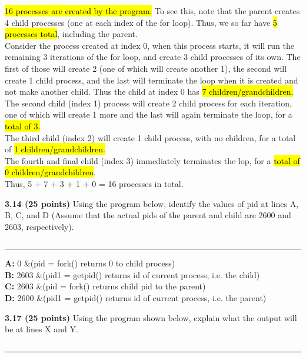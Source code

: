 \documentclass[12pt]{jhwhw}
\begin{document}
	\begin{addmargin}[1em]{}
		\hl{16 processes are created by the program.}
		\bigbreak
		To see this, note that the parent creates 4 child processes (one at each
		index of the for loop). Thus, we so far have \hl{5 processes total}, 
		including the parent. \\
		Consider the process created at index 0, when this process starts, it will run
		the remaining 3 iterations of the for loop, and create 3 child processes of its
		own. The first of those will create 2 (one of which will create another 1), the second
		will create 1 child process, and the last will terminate the loop when it is created
		and not make another child. Thus the child at index 0 has \hl{7 children/grandchildren.} \\
		The second child (index 1) process will create 2 child process for each iteration, one of
		which will create 1 more and the last will again terminate the loop, 
		for a \hl{total of 3.} \\
		The third child (index 2) will create 1 child process, with no children, 
		for a total of \hl{1 children/grandchildren.} \\
		The fourth and final child (index 3) immediately terminates the lop, 
		for a \hl{total of 0 children/grandchildren}.
		\\
		Thus, 5 + 7 + 3 + 1 + 0 = 16 processes in total.
	\end{addmargin}

\bigbreak
\textbf{3.14 (25 points)} Using the program below, identify the values of pid at
	lines A, B, C, and D (Assume that the actual pids of the parent and child
	are 2600 and 2603, respectively).
\inputminted{c}{3.14.c}
\textcolor[RGB]{240,240,240}{\rule{\textwidth}{0.5pt}}\bigbreak

	\begin{addmargin}[1em]{}
		\textbf{A:} 0 &(pid = fork() returns 0 to child process) \\
		\textbf{B:} 2603 &(pid1 = getpid() returns id of current process, i.e. the child) \\
		\textbf{C:} 2603 &(pid = fork() returns child pid to the parent) \\
		\textbf{D:} 2600 &(pid1 = getpid() returns id of current process, i.e. the parent)\\
	\end{addmargin}

\bigbreak
\textbf{3.17 (25 points)} Using the program shown below, explain what the output will be
	at lines X and Y.
\inputminted{c}{3.17.c}
\textcolor[RGB]{240,240,240}{\rule{\textwidth}{0.5pt}}\bigbreak
\end{document}
